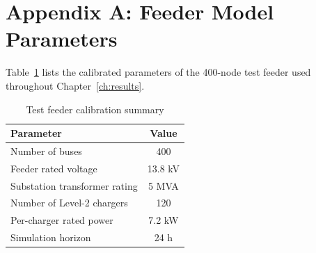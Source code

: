 \chapter*{Appendix A: Feeder Model Parameters}
Table~\ref{tab:appendix} lists the calibrated parameters of the 400-node test feeder used
throughout Chapter~\ref{ch:results}.

\begin{table}[htbp]
\centering
\caption{Test feeder calibration summary}
\label{tab:appendix}
\begin{tabular}{@{}lc@{}}
\toprule
\textbf{Parameter} & \textbf{Value} \\
\midrule
Number of buses & 400 \\
Feeder rated voltage & 13.8 kV \\
Substation transformer rating & 5 MVA \\
Number of Level-2 chargers & 120 \\
Per-charger rated power & 7.2 kW \\
Simulation horizon & 24 h \\
\bottomrule
\end{tabular}
\end{table}
